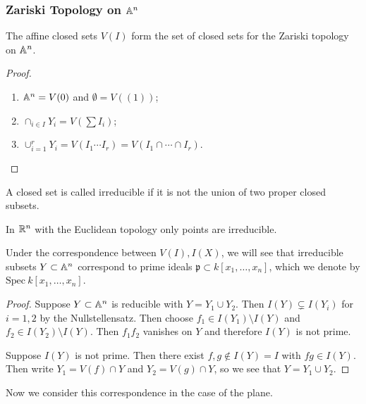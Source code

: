\documentclass[twoside, 10pt]{article}
\begin{document}
    \subsubsection{Zariski Topology on $\mathbb{A}^n$}
    \begin{prop}
        The affine closed sets $V(I)$ form the set of closed sets for the Zariski topology on $\mathbb{A}^n$.
        \begin{proof}
            \begin{enumerate}
                \item $\mathbb{A}^n = V(0)$ and $\emptyset = V((1))$;
                \item $\cap_{i \in I} Y_i = V(\sum I_i)$;
                \item $\cup_{i=1}^r Y_i = V(I_1\cdots I_r) = V(I_1 \cap \cdots \cap I_r)$.
            \end{enumerate}
        \end{proof}
    \end{prop}

    \begin{defn}
        A closed set is called irreducible if it is not the union of two proper closed subsets.
    \end{defn}

    \begin{exm}
        In $\mathbb{R}^n$ with the Euclidean topology only points are irreducible.
    \end{exm}

    \begin{thm}
        Under the correspondence between $V(I), I(X)$, we will see that irreducible subsets $Y \subset \mathbb{A}^n$ correspond to prime ideals $\mathfrak{p} \subset k[x_1, \ldots, x_n]$, which we denote by $\mathrm{Spec}\ k[x_1, \ldots, x_n]$.
        \begin{proof}
            Suppose $Y \subset \mathbb{A}^n$ is reducible with $Y = Y_1 \cup Y_2$. Then $I(Y) \subsetneq I(Y_i)$ for $i=1,2$ by the Nullstellensatz. Then choose $f_1 \in I(Y_1) \setminus I(Y)$ and $f_2 \in I(Y_2) \setminus I(Y)$. Then $f_1f_2$ vanishes on $Y$ and therefore $I(Y)$ is not prime.

            Suppose $I(Y)$ is not prime. Then there exist $f,g \notin I(Y)=I$ with $fg \in I(Y)$. Then write $Y_1 = V(f) \cap Y$ and $Y_2 = V(g) \cap Y$, so we see that $Y = Y_1 \cup Y_2$.
        \end{proof}
    \end{thm}

    Now we consider this correspondence in the case of the plane.
\end{document}
